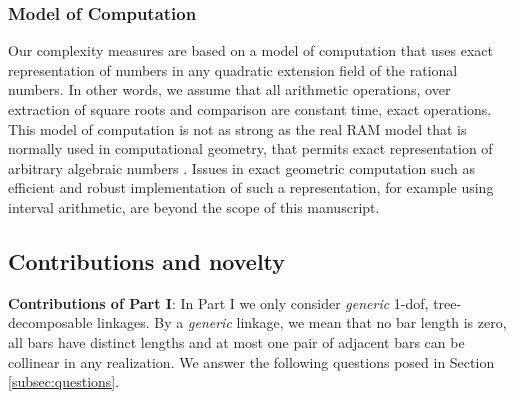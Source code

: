 \documentclass[secthm,amsthm,english]{article}
\theoremstyle{definition}
\theoremstyle{remark}
\begin{document}
\subsubsection{Model of Computation}

Our complexity measures are based on a model of computation that uses exact representation
of numbers in any quadratic extension field of the rational numbers. In other words,
we assume that all arithmetic operations, over extraction of square roots and comparison are
constant time, exact operations. This model of computation is not as strong as the real RAM
model that is normally used in computational geometry, that permits exact representation
of arbitrary algebraic numbers \cite{bib:loos1983computing}. Issues in exact geometric computation such as efficient
and robust implementation of such a representation, for example using interval arithmetic,
are beyond the scope of this manuscript.


\subsection{Contributions and novelty}
\label{sub:contributions}


\noindent\textbf{Contributions of Part I}:  
In Part I we only consider \emph{generic} 1-dof, tree-decomposable linkages. 
By a \emph{generic} linkage, we mean that no bar length is zero, all bars have distinct lengths and 
at most one pair of adjacent bars can be collinear in any realization. 
We answer the following questions posed in Section \ref{subsec:questions}. 
\end{document}
